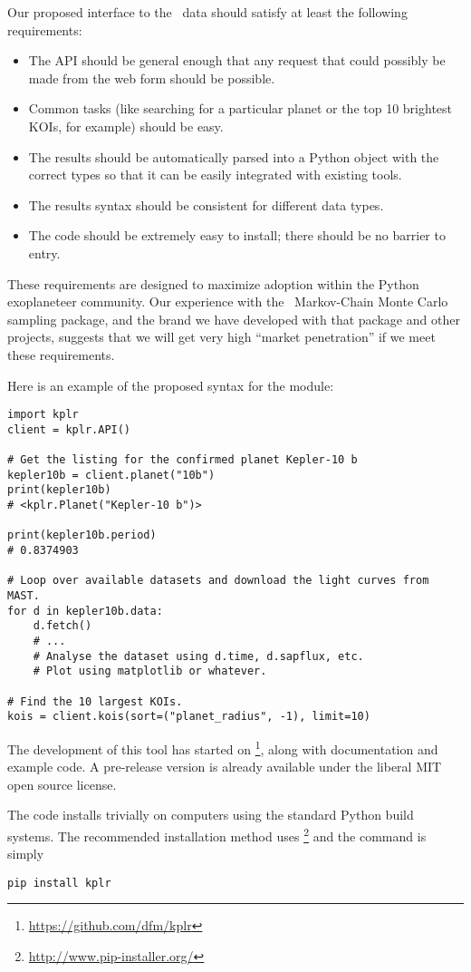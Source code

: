 \documentclass[letterpaper,12pt,preprint]{hack_aastex}
\newcommand{\emcee}{\package{emcee}}
\begin{document}
Our proposed interface to the \Kepler\ data should satisfy at least the
following requirements:
\begin{itemize}
\item The API should be general enough that any request that could
possibly be made from the web form should be possible.
\item Common tasks (like searching for a particular planet or the top 10
brightest KOIs, for example) should be easy.
\item The results should be automatically parsed into a Python object with the
correct types so that it can be easily integrated with existing tools.
\item The results syntax should be consistent for different data types.
\item The code should be extremely easy to install; there should be no
barrier to entry.
\end{itemize}
These requirements are designed to maximize adoption within the Python
exoplaneteer community.
Our experience with the \emcee\ Markov-Chain Monte Carlo sampling package,
and the brand we have developed with that package and other projects,
suggests that we will get very high ``market penetration'' if we meet these
requirements.

Here is an example of the proposed syntax for the module:
\begin{lstlisting}
import kplr
client = kplr.API()

# Get the listing for the confirmed planet Kepler-10 b
kepler10b = client.planet("10b")
print(kepler10b)
# <kplr.Planet("Kepler-10 b")>

print(kepler10b.period)
# 0.8374903

# Loop over available datasets and download the light curves from MAST.
for d in kepler10b.data:
    d.fetch()
    # ...
    # Analyse the dataset using d.time, d.sapflux, etc.
    # Plot using matplotlib or whatever.

# Find the 10 largest KOIs.
kois = client.kois(sort=("planet_radius", -1), limit=10)
\end{lstlisting}
The development of this tool has started on %
\footnote{\url{https://github.com/dfm/kplr}},
along with documentation and example code.
A pre-release version is already available under the liberal MIT open source
license.

The code installs trivially on computers using the standard Python build
systems. The recommended installation method uses \footnote{%
\url{http://www.pip-installer.org/}} and the command is simply
\begin{lstlisting}
pip install kplr
\end{lstlisting}
\end{document}
